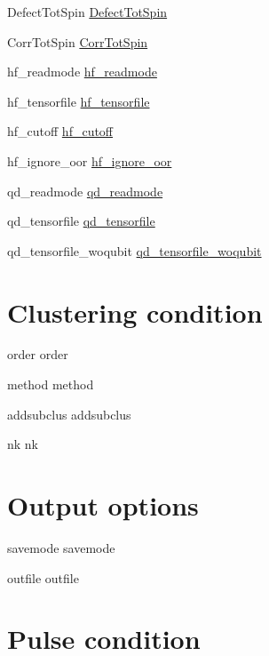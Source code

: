 \begin{DoxyItemize}
\item Defect\-Tot\-Spin \hyperlink{structConfig_a716389cd405e9c041cd3ac7c7608ccdd}{Defect\-Tot\-Spin}
\item Corr\-Tot\-Spin \hyperlink{structConfig_ac923676eaaf0a911eb890ee419c2b8e6}{Corr\-Tot\-Spin}
\item hf\-\_\-readmode \hyperlink{structConfig_a3d4d5a3943f20928bdce09e64fa4bb37}{hf\-\_\-readmode}
\item hf\-\_\-tensorfile \hyperlink{structConfig_a52710072ec30b071e08c1b62f7450c0f}{hf\-\_\-tensorfile}
\item hf\-\_\-cutoff \hyperlink{structConfig_af82a9ccd3b05247db3da179361faef85}{hf\-\_\-cutoff}
\item hf\-\_\-ignore\-\_\-oor \hyperlink{structConfig_a840b086fb6ef148cea4e370967da30e9}{hf\-\_\-ignore\-\_\-oor}
\item qd\-\_\-readmode \hyperlink{structConfig_adc1119b46a95084ddd4c7bfa2a8d50d9}{qd\-\_\-readmode}
\item qd\-\_\-tensorfile \hyperlink{structConfig_a91d5741035098807bc28000a003bd35d}{qd\-\_\-tensorfile}
\item qd\-\_\-tensorfile\-\_\-woqubit \hyperlink{structConfig_a93e5666a93192db9d1cd361381d64301}{qd\-\_\-tensorfile\-\_\-woqubit}
\end{DoxyItemize}\hypertarget{TagVariable_IN_CLUSTER}{}\section{Clustering condition}\label{TagVariable_IN_CLUSTER}

\begin{DoxyItemize}
\item order order
\item method method
\item addsubclus addsubclus
\item nk nk
\end{DoxyItemize}\hypertarget{TagVariable_IN_OUTPUT}{}\section{Output options}\label{TagVariable_IN_OUTPUT}

\begin{DoxyItemize}
\item savemode savemode
\item outfile outfile
\end{DoxyItemize}\hypertarget{TagVariable_IN_PULSE}{}\section{Pulse condition}\label{TagVariable_IN_PULSE}

